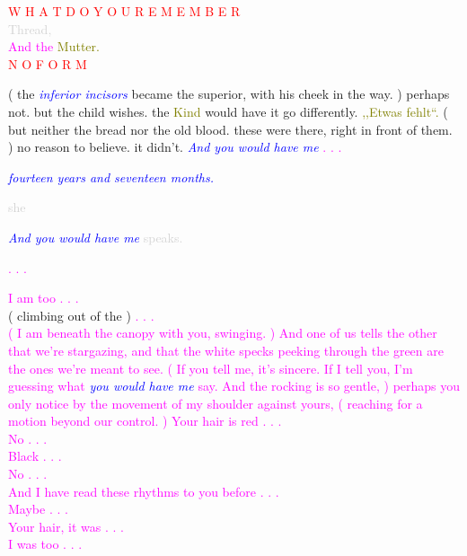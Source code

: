 \documentclass[11pt]{article}
\begin{document}
\begingroup
\begin{center}
\textcolor{red}{W H A T \hspace{10mm} D O \hspace{10mm} Y O U \hspace{10mm} R E M E M B E R} \\ \textcolor{lightgray}{Thread,} \\ \textcolor{magenta}{And the} \textcolor{olive}{Mutter.} \\ \textcolor{red}{N O \hspace{10mm} F O R M}
\end{center}
\endgroup

\begingroup
( the \textit{\textcolor{blue}{inferior incisors}} became the superior, with his cheek in the way. ) perhaps not. but the child wishes. the \textcolor{olive}{Kind} would have it go differently. \textcolor{olive}{,,Etwas fehlt“.} ( but neither the bread nor the old blood. these were there, right in front of them. ) no reason to believe. it didn't. \textit{\textcolor{blue}{And you would have me}} \textcolor{magenta}{. . .} \\ 
\begin{center}
\textit{\textcolor{blue}{fourteen years and seventeen months.}}
\end{center}
\endgroup

\begingroup
\begin{center}
\textcolor{lightgray}{she}
\rightskip\leftskip
\end{center}
\endgroup

\begingroup
\begin{center}
\textit{\textcolor{blue}{And you would have me}} \textcolor{lightgray}{speaks.}
\end{center}
\endgroup

\begingroup
\begin{center}
\textcolor{magenta}{. . .}
\end{center}
\endgroup

\begingroup
\begin{center}
\textcolor{magenta}{ I am too . . . } \\ ( climbing out of the ) \textcolor{magenta}{. . . \\  ( I am beneath the canopy with you, swinging. ) And one of us tells the other that we're stargazing, and that the white specks peeking through the green are the ones we're meant to see. ( If you tell me, it's sincere. If I tell you, I'm guessing what} \textit{\textcolor{blue}{you would have me}} \textcolor{magenta}{say. And the rocking is so gentle, ) perhaps you only notice by the movement of my shoulder against yours, ( reaching for a motion beyond our control. ) Your hair is red . . . \\ No . . . \\ Black . . . \\ No . . . \\ And I have read these rhythms to you before . . . \\ Maybe . . . \\ Your hair, it was . . . \\ I was too . . . }
\end{center}
\endgroup
\end{document}
